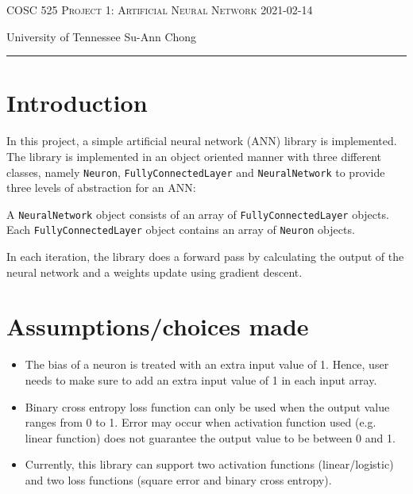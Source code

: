 \documentclass[12pt]{amsart}
\begin{document}
\thispagestyle{empty}

{\scshape COSC 525} \hfill {\scshape \large Project 1: Artificial Neural Network} \hfill {\scshape 2021-02-14}

\smallskip 

{University of Tennessee} \hfill { Su-Ann Chong}

\smallskip

\hrule

\bigskip
\section{Introduction}
In this project, a simple artificial neural network (ANN) library is implemented. The library is implemented in an object oriented manner with three different classes, namely \texttt{Neuron}, \texttt{FullyConnectedLayer} and \texttt{NeuralNetwork} to provide three levels of abstraction for an ANN: \\

\begin{center}
A \texttt{NeuralNetwork} object consists of an array of \texttt{FullyConnectedLayer} objects. \\
Each \texttt{FullyConnectedLayer} object contains an array of \texttt{Neuron} objects.\\
\end{center} 

\bigskip

In each iteration, the library does a forward pass by calculating the output of the neural network and a weights update using gradient descent. 

\section{Assumptions/choices made}
\begin{itemize}
\item The bias of a neuron is treated with an extra input value of 1. Hence, user needs to make sure to add an extra input value of 1 in each input array. \\

\item Binary cross entropy loss function can only be used when the output value ranges from 0 to 1. Error may occur when activation function used (e.g. linear function) does not guarantee the output value to be between 0 and 1. \\

\item Currently, this library can support two activation functions (linear/logistic) and two loss functions (square error and binary cross entropy). 

\end{itemize}
\end{document}
